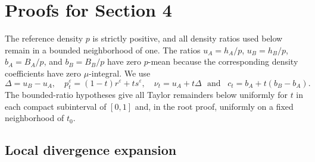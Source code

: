 \documentclass[11pt]{article}
\theoremstyle{plain}
\theoremstyle{definition}
\theoremstyle{definition}
\newcommand{\eps}{\varepsilon}
\begin{document}
\section{Proofs for Section 4}
 The reference density $p$ is strictly positive, and all density ratios used below remain in a bounded neighborhood of one. The ratios $u_A=h_A/p$, $u_B=h_B/p$, $b_A=B_A/p$, and $b_B=B_B/p$ have zero $p$-mean because the corresponding density coefficients have zero $\mu$-integral. We use
\[
\Delta=u_B-u_A,
\quad
p_t^\eps=(1-t)r^\eps+ts^\eps,
\quad
\nu_t=u_A+t\Delta
\,\,\,\,\text{and}\,\,\,\,\,
c_t=b_A+t(b_B-b_A).
\]
The bounded-ratio hypotheses give all Taylor remainders below uniformly for $t$ in each compact subinterval of $[0,1]$ and, in the root proof, uniformly on a fixed neighborhood of $t_0$.

\subsection{Local divergence expansion}
\end{document}
